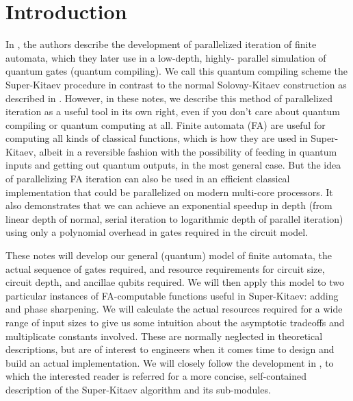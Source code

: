 \section{Introduction}
\label{sec:intro}

In \cite{ksv02}, the authors describe the development of parallelized
iteration of finite automata, which they later use in a low-depth, highly-
parallel simulation of quantum gates (quantum compiling). We call this
quantum compiling
scheme the Super-Kitaev procedure in contrast to the normal
Solovay-Kitaev construction as described in \cite{nc00}.
However, in these notes, we describe
this method of parallelized iteration as a useful tool in its own right,
even if you don't care about quantum compiling or quantum computing at all.
Finite automata (FA) are useful for computing all kinds of classical functions,
which is how they are used in Super-Kitaev, albeit in a reversible fashion
with the possibility of feeding in quantum inputs and getting out quantum
outputs, in the most general case.
But the idea of parallelizing FA iteration can also be used in an
efficient classical implementation that could be parallelized on modern
multi-core processors. It also demonstrates that we can achieve an
exponential speedup in depth (from linear depth of normal, serial iteration to
logarithmic depth of parallel iteration) using only a polynomial overhead in
gates required in the circuit model.

These notes will develop our general (quantum) model of finite automata, the actual
sequence of gates required, and resource requirements for circuit size,
circuit depth, and ancillae qubits required. We will then
apply this model to two particular instances of FA-computable functions useful in
Super-Kitaev: adding and phase sharpening. We will calculate the actual resources
required for a wide range of input sizes to give us some intuition about the
asymptotic tradeoffs and multiplicate constants involved. These are normally
neglected in theoretical descriptions, but are of interest to engineers
when it comes time to design and build an actual implementation. We will closely
follow the development in \cite{ksv02}, to which the interested reader is
referred for a more concise, self-contained description of the Super-Kitaev
algorithm and its sub-modules.
